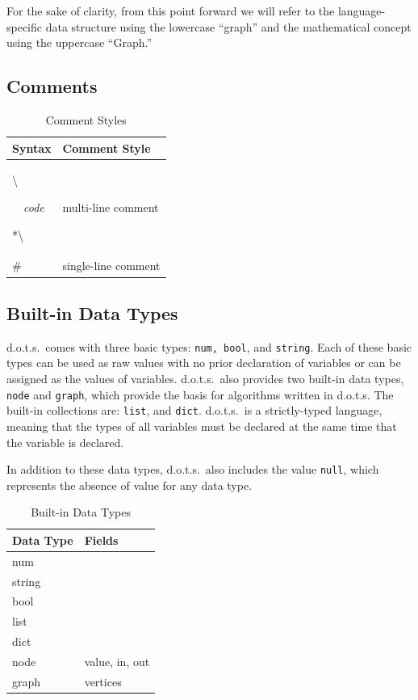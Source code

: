 \documentclass{article}
\newcommand{\pltlang}{d.o.t.s.} %
\newcommand{\code}[1]{\texttt{#1}} %
\begin{document}
For the sake of clarity, from this point forward we will refer to the language-specific data structure using the lowercase ``graph'' and the mathematical concept using the uppercase ``Graph.''

\subsection{Comments}

\begin{table}[H]
\centering
\begin{tabular}{| p{.75in} | p{2in} |}
\hline
Syntax & Comment Style \\
\hline
\textbackslash*

$\quad$\emph{code} 

*\textbackslash & multi-line comment \\
\hline
\# & single-line comment \\
\hline
\end{tabular}
\caption{Comment Styles}
\label{tbl:comments}
\end{table}

\subsection{Built-in Data Types}

\pltlang\ comes with three basic types: \code{num, bool}, and \code{string}. Each of these basic types can be used as raw values with no prior declaration of variables or can be assigned as the values of variables. \pltlang\ also provides two built-in data types, \code{node} and \code{graph}, which provide the basis for algorithms written in \pltlang{} The built-in collections are: \code{list}, and \code{dict}. \pltlang\ is a strictly-typed language, meaning that the types of all variables must be declared at the same time that the variable is declared.

In addition to these data types, \pltlang\ also includes the value \code{null}, which represents the absence of value for any data type.

\begin{table}[H]
\centering
\begin{tabular}{| p{.75in} | p{2in} |}
\hline
Data Type & Fields \\
\hline
num & \\
string & \\
bool & \\
list &  \\
dict &  \\
node & value, in, out \\
graph & vertices \\
\hline
\end{tabular}
\caption{Built-in Data Types}
\label{tbl:data_types}
\end{table}
\end{document}

